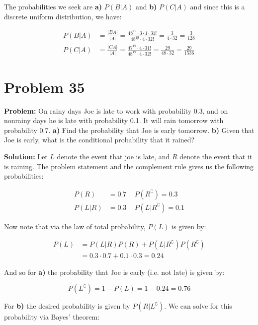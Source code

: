 \documentclass{article}
\begin{document}
The probabilities we seek are \textbf{a)} $P(B| A)$ and \textbf{b)} $P(C| A)$ and since this is a discrete uniform distribution, we have:

\begin{align*}
    P(B| A)&=\frac{|BA|}{|A|}=\frac{48^{\underline{19}}\cdot 3\cdot 1\cdot 31!}{48^{\underline{19}}\cdot 4\cdot 32!}=\frac{3}{4\cdot 32}=\frac{3}{128}\\
    P(C| A)&=\frac{|CA|}{|A|}=\frac{47^{\underline{19}}\cdot 4\cdot 31!}{48^{\underline{19}}\cdot 4\cdot 32!}=\frac{29}{48\cdot 32}=\frac{29}{1536}
\end{align*}

\section*{Problem 35}
\noindent\textbf{Problem:} On rainy days Joe is late to work with probability 0.3, and on nonrainy days he is late with probability 0.1. It will rain tomorrow with probability 0.7. \textbf{a)} Find the probability that Joe is early tomorrow. \textbf{b)} Given that Joe is early, what is the conditional probability that it rained?
\bigskip

\noindent\textbf{Solution:} Let $L$ denote the event that joe is late, and $R$ denote the event that it is raining. The problem statement and the complement rule gives us the following probabilities:

\begin{align*}
    P(R)&=0.7\,\,\,\,\,\,\,P(R^\complement)=0.3\\
    P(L| R)&=0.3\,\,\,\,\,\,\,P(L| R^\complement)=0.1
\end{align*}

Now note that via the law of total probability, $P(L)$ is given by:

\begin{align*}
    P(L)&=P(L| R)P(R)+P(L| R^\complement)P(R^\complement)\\
    &=0.3\cdot0.7+0.1\cdot0.3=0.24
\end{align*}

And so for \textbf{a)} the probability that Joe is early (i.e. not late) is given by:

\begin{equation*}
    P(L^\complement)=1-P(L)=1-0.24=0.76
\end{equation*}

For \textbf{b)} the desired probability is given by $P(R| L^\complement)$. We can solve for this probability via Bayes' theorem:
\end{document}
